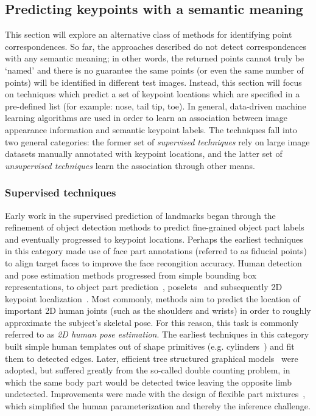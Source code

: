 \subsection{Predicting keypoints with a semantic meaning}

This section will explore an alternative class of methods for identifying point correspondences. So far, the approaches described do not detect correspondences with any semantic meaning; in other words, the returned points cannot truly be `named' and there is no guarantee the same points (or even the same number of points) will be identified in different test images. Instead, this section will focus on techniques which predict a set of keypoint locations which are specified in a pre-defined list (for example: nose, tail tip, toe). In general, data-driven machine learning algorithms are used in order to learn an association between image appearance information and semantic keypoint labels. The techniques fall into two general categories: the former set of \emph{supervised techniques} rely on large image datasets manually annotated with keypoint locations, and the latter set of \emph{unsupervised techniques} learn the association through other means. 

\subsubsection{Supervised techniques}

Early work in the supervised prediction of landmarks began through the refinement of object detection methods to predict fine-grained object part labels and eventually progressed to keypoint locations. Perhaps the earliest techniques in this category made use of face part annotations (referred to as fiducial points) to align target faces to improve the face recongition accuracy. Human detection and pose estimation methods progressed from simple bounding box representations, to object part prediction~\cite{xxx,xxx}, poselets~\cite{pose-kposelets} and subsequently 2D keypoint localization~\cite{xxx,xxx}. Most commonly, methods aim to predict the location of important 2D human joints (such as the shoulders and wrists) in order to roughly approximate the subject's skeletal pose. For this reason, this task is commonly referred to as \emph{2D human pose estimation}. The earliest techniques in this category built simple human templates out of shape primitives (e.g. cylinders~\cite{pose-hogg}) and fit them to detected edges. Later, efficient tree structured graphical models~\cite{pose-felzen} were adopted, but suffered greatly from the so-called double counting problem, in which the same body part would be detected twice leaving the opposite limb undetected. Improvements were made with the design of flexible part mixtures~\cite{yang2013articulated}, which simplified the human parameterization and thereby the inference challenge.

